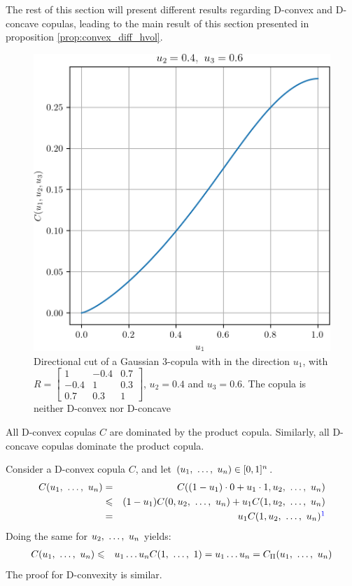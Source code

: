 The rest of this section will present different results regarding D-convex and D-concave copulas, leading to the main result of this section presented in proposition \ref{prop:convex_diff_hvol}.

\begin{figure}
    \centering
    \includegraphics[width=0.5\linewidth]{Images/Chap_2/Gaussian_copula/gaussian_copula_n3.png}
    \caption{Directional cut of a Gaussian 3-copula with in the direction $u_1$, with $R=\begin{bmatrix} 1 & -0.4 & 0.7\\ -0.4 & 1 & 0.3\\ 0.7 & 0.3 & 1 \end{bmatrix}$, $u_2=0.4$ and $u_3=0.6$. The copula is neither D-convex nor D-concave}
    \label{fig:gaussian_copula_simu_n3}
\end{figure}

\begin{remark}
    All D-convex copulas $C$ are dominated by the product copula. Similarly, all D-concave copulas dominate the product copula.

    Consider a D-convex copula $C$, and let $(u_1, ~\dots, ~ u_n)\in[0,1]^n$.
    \begin{eqnarray*}
        C(u_1\enum u_n) &=& C((1-u_1)\cdot0+u_1\cdot 1, u_2\enum u_n)\\
        &\leqslant& (1-u_1)C(0, u_2\enum u_n)+u_1C(1, u_2\enum u_n)\\
        &=& u_1C(1, u_2\enum u_n)\commanue{alors moi je laisserais le symbole $\leqslant$ et pas $=$}
    \end{eqnarray*}
    Doing the same for $u_2, ~\dots, ~ u_n$ yields:
    \begin{eqnarray*}
        C(u_1, ~\dots, ~ u_n) &\leqslant& u_1\dots u_nC(1, ~\dots, ~1) = u_1\dots u_n = C_\Pi(u_1, ~\dots, ~ u_n)
    \end{eqnarray*}
    The proof for D-convexity is similar.
\end{remark}

